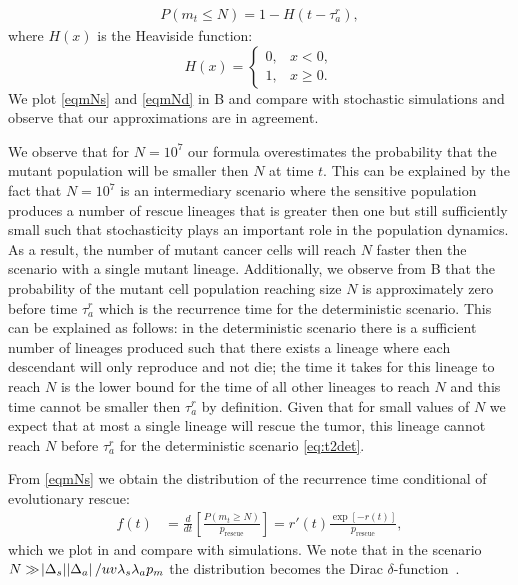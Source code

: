 \documentclass[12pt]{extarticle}
\newcommand{\presc}{p_\text{rescue}}
\begin{document}
\begin{appendices}
\begin{align}\label{eqmNd}
P\left(m_t\leq N\right)=1-H\left(t-\tau_a^r\right),
\end{align}
where $H(x)$ is the Heaviside function:
\begin{equation*}
H\left(x\right) = \begin{cases}
    0 ,&
  x<0 ,\\ 
  1 ,&
  x\geq0 .
  \end{cases}
\end{equation*}
We plot \cref{eqmNs} and \cref{eqmNd} in B and compare with stochastic simulations and observe that our approximations are in agreement. %

We observe that for $N=10^7$ our formula overestimates the probability that the mutant population will be smaller then $N$ at time $t$.  This can be explained by the fact that $N=10^7$ is an intermediary scenario where the sensitive population produces a number of rescue lineages that is greater then one but still sufficiently small such that stochasticity plays an important role in the population dynamics. As a result, the number of mutant cancer cells will reach $N$ faster then the scenario with a single mutant lineage. Additionally, we observe from B that the probability of the mutant cell population reaching size $N$ is approximately zero before time $\tau_a^r$ which is the recurrence time for the deterministic scenario. This can be explained as follows: in the deterministic scenario there is a sufficient number of lineages produced such that there exists a lineage where each descendant will only reproduce and not die; the time it takes for this lineage to reach $N$ is the lower bound for the time of all other lineages to reach $N$ and this time cannot be smaller then $\tau_a^r$ by definition. Given that for small values of $N$ we expect that at most a single lineage will rescue the tumor, this lineage cannot reach $N$ before $\tau_a^r$ for the deterministic scenario \cref{eq:t2det}.

From  \cref{eqmNs} we obtain the distribution of the recurrence time conditional of evolutionary rescue: %
\begin{align}\label{distribution}
f\left(t\right)&=\frac{d}{dt}\left[\frac{P\left(m_t\geq N\right)}{\presc}\right]=r'\left(t\right)\frac{\exp\left[-r\left(t\right)\right]}{\presc},
\end{align}
which we plot in  and compare with simulations. We note that in the scenario $N\gg\abs{\Delta_s}\abs{\Delta_a}/uv\lambda_s\lambda_ap_m$ the distribution becomes the Dirac $\delta$-function~\citep{barton1989elements}.

\end{appendices}
\end{document}
